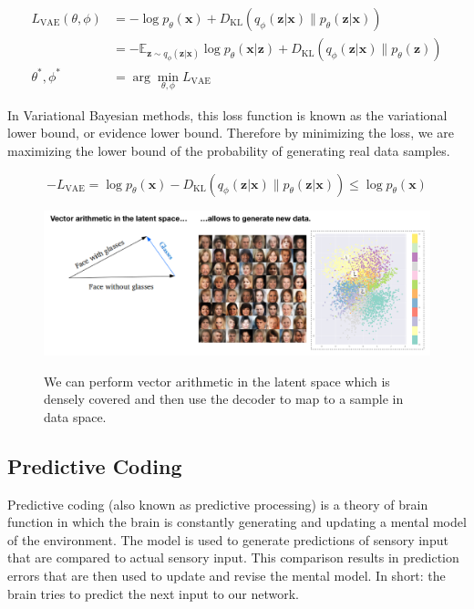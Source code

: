 \documentclass[main]{subfiles}
\begin{document}
\begin{align}
L_\text{VAE}(\theta, \phi) 
&= -\log p_\theta(\mathbf{x}) + D_\text{KL}( q_\phi(\mathbf{z}\vert\mathbf{x}) \| p_\theta(\mathbf{z}\vert\mathbf{x}) )\\
&= - \mathbb{E}_{\mathbf{z} \sim q_\phi(\mathbf{z}\vert\mathbf{x})} \log p_\theta(\mathbf{x}\vert\mathbf{z}) + D_\text{KL}( q_\phi(\mathbf{z}\vert\mathbf{x}) \| p_\theta(\mathbf{z}) ) \\
\theta^{*}, \phi^{*} &= \arg\min_{\theta, \phi} L_\text{VAE}
\end{align}

In Variational Bayesian methods, this loss function is known as the variational lower bound, or evidence lower bound.
Therefore by minimizing the loss, we are maximizing the lower bound of the probability of generating real data samples.

\begin{equation}
    -L_\text{VAE} = \log p_\theta(\mathbf{x}) - D_\text{KL}( q_\phi(\mathbf{z}\vert\mathbf{x}) \| p_\theta(\mathbf{z}\vert\mathbf{x}) ) \leq \log p_\theta(\mathbf{x})
\end{equation}


 \begin{figure}[H]
	\centering
	\includegraphics[width=0.9\linewidth]{07_UnsupervisedAndSelfsupervisedLearning/figures/autoencoder-vae-gen.png}
	\label{fig:reparam}
	\caption{We can perform vector arithmetic in the latent space which is densely covered and then use the decoder to map to a sample in data space.}
\end{figure}

\subsection{Predictive Coding}
Predictive coding (also known as predictive processing) is a theory of brain function in which the brain is constantly generating and updating a mental model of the environment. The model is used to generate predictions of sensory input that are compared to actual sensory input. This comparison results in prediction errors that are then used to update and revise the mental model. In short: the brain tries to predict the next input to our network.
\end{document}

